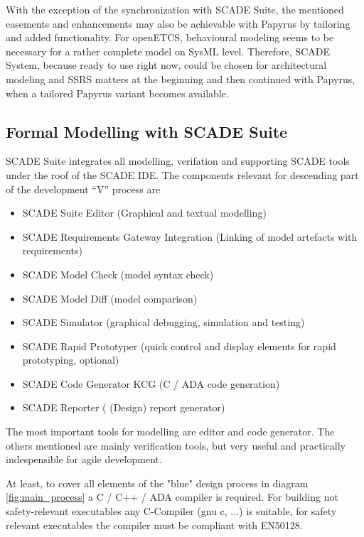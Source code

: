 With the exception of the synchronization with SCADE Suite, the mentioned easements and enhancements may also be achievable with Papyrus by tailoring and added functionality.
For openETCS, behavioural modeling seems to be necessary for a rather complete model on SysML level. 
Therefore, SCADE System, because ready to use right now, could be chosen for architectural modeling and SSRS matters at the beginning and then continued with Papyrus, when a tailored Papyrus variant becomes available.  

\subsection{Formal Modelling with SCADE Suite}
\label{sec:FormalModellingwithSCADESuite}

SCADE Suite integrates all modelling, verifation and supporting SCADE tools under the roof of the SCADE IDE. The components relevant for descending part of the development "`V"' process are

\begin{itemize}
	\item SCADE Suite Editor (Graphical and textual modelling)
	\item SCADE Requirements Gateway Integration (Linking of model artefacts with requirements)
	\item SCADE Model Check (model syntax check)
	\item SCADE Model Diff (model comparison)
	\item SCADE Simulator (graphical debugging, simulation and testing) 
	\item SCADE Rapid Prototyper (quick control and display elements for rapid prototyping, optional)
	\item SCADE Code Generator KCG (C / ADA code generation)
	\item SCADE Reporter ( (Design) report generator)
\end{itemize}

The most important tools for modelling are editor and code generator. The others mentioned are mainly verification tools, but very useful and practically indespensible for agile development.

At least, to cover all elements of the "blue" design process in diagram \ref{fig:main_process} a C / C++ / ADA compiler is required. 
For building not safety-relevant executables any C-Compiler (gnu c, ...) is suitable, for safety relevant executables the compiler must be compliant with EN50128.   

